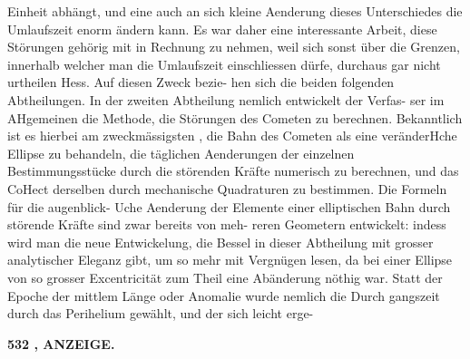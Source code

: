 \documentclass[12pt,a4paper]{article}
\begin{document}
Einheit  abhängt,  und  eine  auch  an  sich  kleine  Aenderung dieses  Unterschiedes  die  Umlaufszeit  enorm  ändern  kann.  Es  war  daher  eine  interessante  Arbeit,  diese Störungen  gehörig  mit  in  Rechnung  zu  nehmen,  weil  sich  sonst  über  die  Grenzen,  innerhalb  welcher man  die  Umlaufszeit  einschliessen  dürfe,  durchaus  gar  nicht  urtheilen  Hess.  Auf  diesen  Zweck  bezie- hen sich  die  beiden  folgenden  Abtheilungen.  In  der  zweiten  Abtheilung  nemlich  entwickelt  der  Verfas- ser im  AHgemeinen  die  Methode,  die  Störungen  des  Cometen  zu  berechnen.  Bekanntlich  ist  es  hierbei am  zweckmässigsten ,  die  Bahn  des  Cometen  als  eine  veränderHche  Ellipse  zu  behandeln,  die  täglichen Aenderungen  der  einzelnen  Bestimmungsstücke  durch  die  störenden  Kräfte  numerisch  zu  berechnen,  und das  CoHect  derselben  durch  mechanische  Quadraturen  zu  bestimmen.  Die  Formeln  für  die  augenblick- Uche  Aenderung  der  Elemente  einer  elliptischen  Bahn  durch  störende  Kräfte  sind  zwar  bereits  von  meh- reren Geometern  entwickelt:  indess  wird  man  die  neue  Entwickelung,  die  Bessel  in  dieser  Abtheilung mit  grosser  analytischer  Eleganz  gibt,  um  so  mehr  mit  Vergnügen  lesen,  da  bei  einer  Ellipse  von  so grosser  Excentricität  zum  Theil  eine  Abänderung  nöthig  war.  Statt  der  Epoche  der  mittlem  Länge  oder Anomalie  wurde  nemlich  die  Durch gangszeit  durch  das  Perihelium  gewählt,    und   der  sich  leicht  erge-

\vspace{0.5em}


\noindent\textbf{532  ,  ANZEIGE.}
\end{document}
